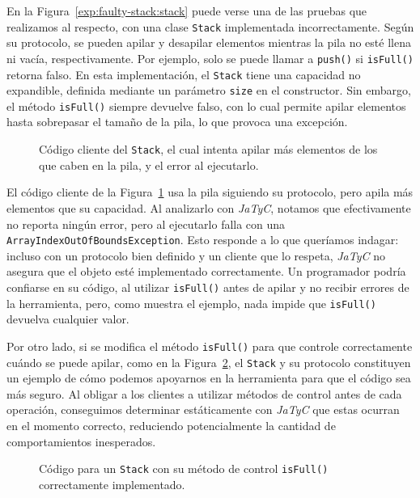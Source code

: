 En la Figura~\ref{exp:faulty-stack:stack} puede verse una de las pruebas que realizamos al respecto, con una clase \texttt{Stack} implementada incorrectamente. Según su protocolo, se pueden apilar y desapilar elementos mientras la pila no esté llena ni vacía, respectivamente. Por ejemplo, solo se puede llamar a \texttt{push()} si \texttt{isFull()} retorna falso. En esta implementación, el \texttt{Stack} tiene una capacidad no expandible, definida mediante un parámetro \texttt{size} en el constructor. Sin embargo, el método \texttt{isFull()} siempre devuelve falso, con lo cual permite apilar elementos hasta sobrepasar el tamaño de la pila, lo que provoca una excepción.

\begin{figure}[htbp]
    \centering
    
    \vspace{0.3cm}
    
    \caption{Código cliente del \texttt{Stack}, el cual intenta apilar más elementos de los que caben en la pila, y el error al ejecutarlo.}
    \label{exp:faulty-stack:client}
\end{figure}

El código cliente de la Figura~\ref{exp:faulty-stack:client} usa la pila siguiendo su protocolo, pero apila más elementos que su capacidad. Al analizarlo con \textit{JaTyC}, notamos que efectivamente no reporta ningún error, pero al ejecutarlo falla con una \texttt{ArrayIndexOutOfBoundsException}. Esto responde a lo que queríamos indagar: incluso con un protocolo bien definido y un cliente que lo respeta, \textit{JaTyC} no asegura que el objeto esté implementado correctamente. Un programador podría confiarse en su código, al utilizar \texttt{isFull()} antes de apilar y no recibir errores de la herramienta, pero, como muestra el ejemplo, nada impide que \texttt{isFull()} devuelva cualquier valor.

Por otro lado, si se modifica el método \texttt{isFull()} para que controle correctamente cuándo se puede apilar, como en la Figura~\ref{exp:normal-stack}, el \texttt{Stack} y su protocolo constituyen un ejemplo de cómo podemos apoyarnos en la herramienta para que el código sea más seguro. Al obligar a los clientes a utilizar métodos de control antes de cada operación, conseguimos determinar estáticamente con \textit{JaTyC} que estas ocurran en el momento correcto, reduciendo potencialmente la cantidad de comportamientos inesperados.

\begin{figure}[htbp]
    \centering
    
    \caption{Código para un \texttt{Stack} con su método de control \texttt{isFull()} correctamente implementado.}
    \label{exp:normal-stack}
\end{figure}

